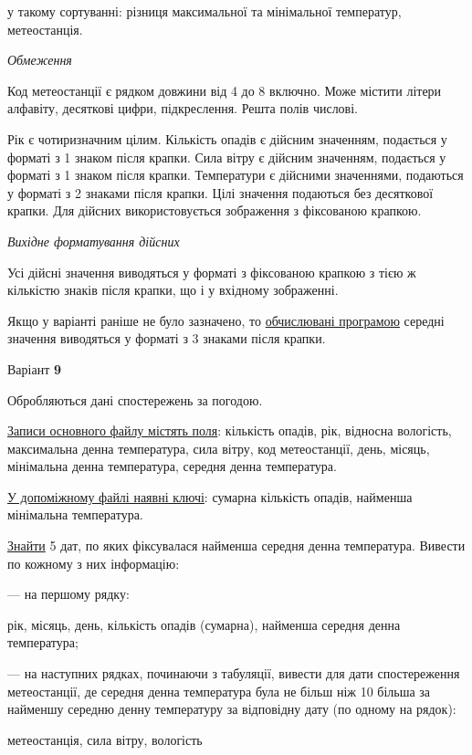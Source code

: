 \documentclass[11pt, ukrainian]{article}
\begin{document}
{\noindent}у такому сортуванні: різниця максимальної та мінімальної температур, метеостанція.


\bigskip\textit{Обмеження}

Код метеостанції є рядком довжини від 4 до 8 включно.
Може містити літери алфавіту, десяткові цифри, підкреслення. Решта полів числові.

Рік є чотиризначним цілим.
Кількість опадів є дійсним значенням, подається у форматі з 1 знаком після крапки.
Сила вітру є дійсним значенням, подається у форматі з 1 знаком після крапки.
Температури є дійсними значеннями, подаються у форматі з 2 знаками після крапки.
Цілі значення подаються без десяткової крапки.
Для дійсних використовується зображення з фіксованою крапкою.

\textit{Вихідне форматування дійсних}

Усі дійсні значення виводяться у форматі з фіксованою крапкою з тією ж кількістю знаків після крапки, що і у вхідному зображенні.

Якщо у варіанті раніше не було зазначено, то \underline{обчислювані програмою} середні значення виводяться у форматі з 3 знаками після крапки.


\par
\newpage
{\center Варіант  \No \textbf { 9 }\par}
\bigskip
Обробляються дані спостережень за погодою. 

\underline{Записи основного файлу містять поля}: кількість опадів, рік, відносна вологість, максимальна денна температура, сила вітру, код метеостанції, день, місяць, мінімальна денна температура, середня денна температура.

\underline{У допоміжному файлі наявні ключі}: сумарна кількість опадів, найменша мінімальна температура.

\underline{Знайти} 5 дат, по яких фіксувалася найменша середня денна температура. Вивести по кожному з них інформацію:\par
{\noindent}--- на першому рядку:\par
рік, місяць, день, кількість опадів (сумарна), найменша середня денна температура;

{\noindent}--- на наступних рядках, починаючи з табуляції, вивести для дати спостереження метеостанції, де середня денна температура була не більш ніж 10 більша за найменшу середню денну температуру за відповідну дату (по одному на рядок):\par
метеостанція, сила вітру, вологість
\end{document}
